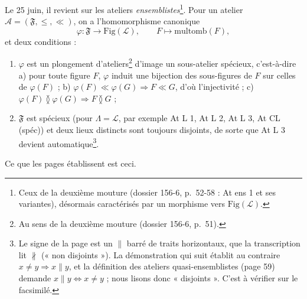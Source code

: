 \documentclass[11pt,a4paper]{article}
\begin{document}
Le 25 juin, il revient sur les ateliers \emph{ensemblistes}\footnote{Ceux de la
deuxième mouture (dossier 156-6, p.~52-58 : At ens 1 et ses variantes), désormais
caractérisés par un morphisme vers $\mathrm{Fig}(\mathcal{L})$.}. Pour un atelier
$\mathcal{A} = (\mathfrak{F}, \leq, \ll)$, on a l'homomorphisme canonique
\[
\varphi : \mathfrak{F} \to \mathrm{Fig}(\mathcal{L}), \qquad F \mapsto
\mathrm{multomb}(F) ,
\]
et deux conditions :
\begin{enumerate}
\item[(i)] $\varphi$ est un plongement d'ateliers\footnote{Au sens de la deuxième
mouture (dossier 156-6, p.~51).} d'image un sous-atelier spécieux, c'est-à-dire
a) pour toute figure $F$, $\varphi$ induit une bijection des sous-figures de $F$
sur celles de $\varphi(F)$ ; b) $\varphi(F) \ll \varphi(G) \Rightarrow F \ll G$, d'où
l'injectivité ; c) $\varphi(F) \between \varphi(G) \Rightarrow F \between G$ ;
\item[(ii)] $\mathfrak{F}$ est spécieux (pour $\Lambda = \mathcal{L}$, par exemple
At L 1, At L 2, At L 3, At CL (spéc)) et deux lieux distincts sont toujours
disjoints, de sorte que At L 3 devient automatique\footnote{Le signe de la page est
un $\parallel$ barré de traits horizontaux, que la transcription lit $\nparallel$
(« non disjoints »). La démonstration qui suit établit au contraire $x \neq y
\Rightarrow x \parallel y$, et la définition des ateliers quasi-ensemblistes (page
59) demande $x \parallel y \iff x \neq y$ ; nous lisons donc « disjoints ». C'est à
vérifier sur le facsimilé.}.
\end{enumerate}
Ce que les pages établissent est ceci.
\end{document}
